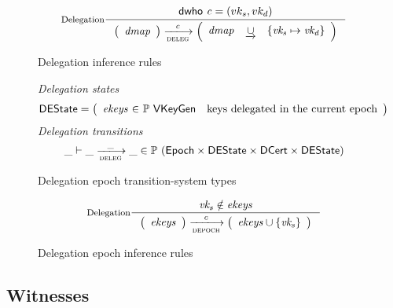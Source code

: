 \begin{figure}
  \begin{equation}\label{eq:delegation}
    \inference[Delegation]
    {\dwho{c} = (vk_s, vk_d)
    }
    {
      \left(
      \begin{array}{r}
        \var{dmap}
      \end{array}
      \right)
      \trans{deleg}{c}
      \left(
      \begin{array}{lcl}
        \var{dmap} & \unionoverride & \{\var{vk_s} \mapsto \var{vk_d}\}
      \end{array}
      \right)
    }
  \end{equation}
  \caption{Delegation inference rules}
  \label{fig:rules:delegation}
\end{figure}

\begin{figure}
  \emph{Delegation states}
  \begin{align*}
    & \DEState
      = \left(
        \begin{array}{r@{~\in~}lr}
          \var{ekeys} & \powerset{\VKeyGen} & \text{keys delegated in the current epoch}
        \end{array}\right)
  \end{align*}
  \emph{Delegation transitions}
  \begin{equation*}
    \_ \vdash \_ \trans{deleg}{\_} \_ \in
      \powerset (\Epoch \times \DEState \times \DCert \times \DEState)
    \end{equation*}
  \caption{Delegation epoch transition-system types}
  \label{fig:ts-types:depoch}
\end{figure}

\begin{figure}
  \begin{equation}\label{eq:rule:depoch}
    \inference[Delegation]
    {\var{vk_s} \notin \var{ekeys}
    }
    {
      \left(
      \begin{array}{r}
        \var{ekeys}
      \end{array}
      \right)
      \trans{depoch}{c}
      \left(
      \begin{array}{lcl}
        \var{ekeys} \cup \{\var{vk_s}\}
      \end{array}
      \right)
    }
  \end{equation}
  \caption{Delegation epoch inference rules}
  \label{fig:rules:depoch}
\end{figure}


\subsection{Witnesses}
\label{sec:delegation-witnesses}

